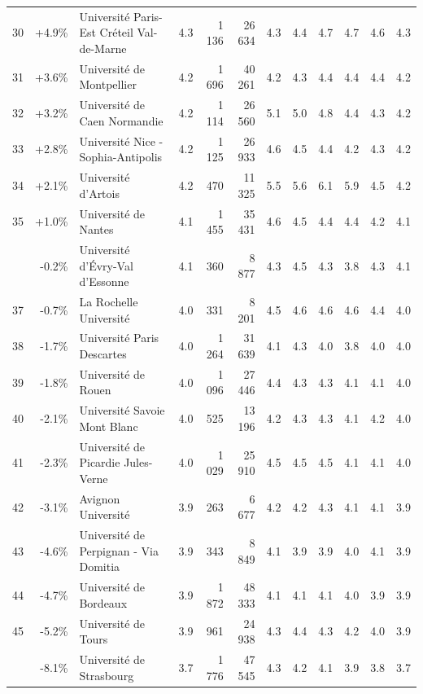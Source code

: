\documentclass[12pt,french,landscape]{article}
\begin{document}
\begin{longtable}{rrlrrrrrrlrr}
30 & +4.9\% & Université Paris-Est Créteil Val-de-Marne & 4.3 & 1 136 & 26 634 & 4.3 & 4.4 & 4.7 & 4.7 & 4.6 & 4.3\\
\addlinespace
\rowcolor{gray!6}  31 & +3.6\% & Université de Montpellier & 4.2 & 1 696 & 40 261 & 4.2 & 4.3 & 4.4 & 4.4 & 4.4 & 4.2\\
32 & +3.2\% & Université de Caen Normandie & 4.2 & 1 114 & 26 560 & 5.1 & 5.0 & 4.8 & 4.4 & 4.3 & 4.2\\
\rowcolor{gray!6}  33 & +2.8\% & Université Nice - Sophia-Antipolis & 4.2 & 1 125 & 26 933 & 4.6 & 4.5 & 4.4 & 4.2 & 4.3 & 4.2\\
34 & +2.1\% & Université d'Artois & 4.2 & 470 & 11 325 & 5.5 & 5.6 & 6.1 & 5.9 & 4.5 & 4.2\\
\rowcolor{gray!6}  35 & +1.0\% & Université de Nantes & 4.1 & 1 455 & 35 431 & 4.6 & 4.5 & 4.4 & 4.4 & 4.2 & 4.1\\
\addlinespace
36 & -0.2\% & Université d'Évry-Val d'Essonne & 4.1 & 360 & 8 877 & 4.3 & 4.5 & 4.3 & 3.8 & 4.3 & 4.1\\
\rowcolor{gray!6}  37 & -0.7\% & La Rochelle Université & 4.0 & 331 & 8 201 & 4.5 & 4.6 & 4.6 & 4.6 & 4.4 & 4.0\\
38 & -1.7\% & Université Paris Descartes & 4.0 & 1 264 & 31 639 & 4.1 & 4.3 & 4.0 & 3.8 & 4.0 & 4.0\\
\rowcolor{gray!6}  39 & -1.8\% & Université de Rouen & 4.0 & 1 096 & 27 446 & 4.4 & 4.3 & 4.3 & 4.1 & 4.1 & 4.0\\
40 & -2.1\% & Université Savoie Mont Blanc & 4.0 & 525 & 13 196 & 4.2 & 4.3 & 4.3 & 4.1 & 4.2 & 4.0\\
\addlinespace
\rowcolor{gray!6}  41 & -2.3\% & Université de Picardie Jules-Verne & 4.0 & 1 029 & 25 910 & 4.5 & 4.5 & 4.5 & 4.1 & 4.1 & 4.0\\
42 & -3.1\% & Avignon Université & 3.9 & 263 & 6 677 & 4.2 & 4.2 & 4.3 & 4.1 & 4.1 & 3.9\\
\rowcolor{gray!6}  43 & -4.6\% & Université de Perpignan - Via Domitia & 3.9 & 343 & 8 849 & 4.1 & 3.9 & 3.9 & 4.0 & 4.1 & 3.9\\
44 & -4.7\% & Université de Bordeaux & 3.9 & 1 872 & 48 333 & 4.1 & 4.1 & 4.1 & 4.0 & 3.9 & 3.9\\
\rowcolor{gray!6}  45 & -5.2\% & Université de Tours & 3.9 & 961 & 24 938 & 4.3 & 4.4 & 4.3 & 4.2 & 4.0 & 3.9\\
\addlinespace
46 & -8.1\% & Université de Strasbourg & 3.7 & 1 776 & 47 545 & 4.3 & 4.2 & 4.1 & 3.9 & 3.8 & 3.7\\

\end{longtable}
\end{document}
